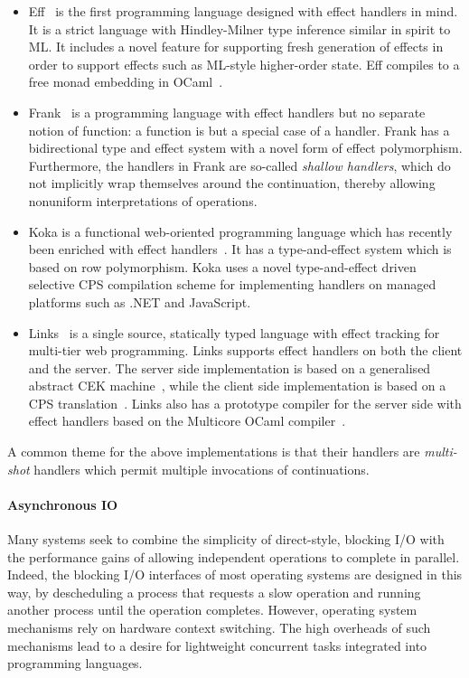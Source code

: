 \documentclass{llncs}
\begin{document}
\begin{itemize}
\item Eff~\citep*{BauerP15} is the first programming language designed
  with effect handlers in mind. It is a strict language with
  Hindley-Milner type inference similar in spirit to ML.
%
  It includes a novel feature for supporting fresh generation of
  effects in order to support effects such as ML-style higher-order
  state. Eff compiles to a free monad embedding in
  OCaml~\citep*{PretnarSFS17}.
%
\item Frank~\citep*{LindleyMM17} is a programming language with effect
  handlers but no separate notion of function: a function is but a
  special case of a handler. Frank has a bidirectional type and effect
  system with a novel form of effect polymorphism. Furthermore, the
  handlers in Frank are so-called \emph{shallow handlers}, which do
  not implicitly wrap themselves around the continuation, thereby
  allowing nonuniform interpretations of operations.
%
\item Koka is a functional web-oriented programming language which has
  recently been enriched with effect handlers~\citep*{Leijen17}. It has
  a type-and-effect system which is based on row polymorphism. Koka
  uses a novel type-and-effect driven selective CPS compilation scheme
  for implementing handlers on managed platforms such as .NET and
  JavaScript.
%
\item Links~\citep*{CooperLWY06} is a single source, statically typed language
	with effect tracking for multi-tier web programming. Links supports effect
	handlers on both the client and the server. The server side implementation is
	based on a generalised abstract CEK machine~\citep*{HillerstromL16}, while
	the client side implementation is based on a CPS
	translation~\citep*{HillerstromLAS17}. Links also has a prototype compiler
	for the server side with effect handlers based on the Multicore OCaml
	compiler~\citep*{HillerstromLS16}.
\end{itemize}

A common theme for the above implementations is that their handlers
are \emph{multi-shot} handlers which permit multiple invocations of
continuations.

\paragraph{Asynchronous IO}

Many systems seek to combine the simplicity of direct-style, blocking I/O with
the performance gains of allowing independent operations to complete in
parallel. Indeed, the blocking I/O interfaces of most operating systems are
designed in this way, by descheduling a process that requests a slow operation
and running another process until the operation completes. However, operating
system mechanisms rely on hardware context switching. The high overheads of
such mechanisms lead to a desire for lightweight concurrent tasks integrated
into programming languages.
\end{document}
